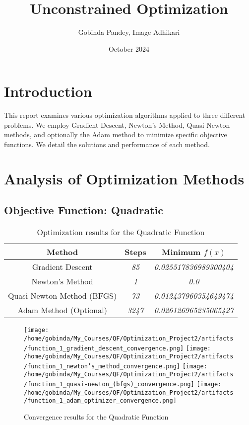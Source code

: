 \documentclass[12pt]{article}
\title{Unconstrained Optimization}
\author{Gobinda Pandey, Image Adhikari}
\date{October 2024}
\begin{document}
\maketitle

\section{Introduction}
This report examines various optimization algorithms applied to three different problems. We employ Gradient Descent, Newton's Method, Quasi-Newton methods, and optionally the Adam method to minimize specific objective functions. We detail the solutions and performance of each method.

\section{Analysis of Optimization Methods}
\subsection*{Objective Function: Quadratic}
\begin{table}[htbp]
   \centering
   \small %
   \begin{tabular}{|c|c|c|}
      \hline
      \textbf{Method} & \textbf{Steps} & \textbf{Minimum \( f(x) \)} \\
      \hline
      Gradient Descent & \textit{85} & \textit{0.025517836989300404} \\
      \hline
      Newton's Method & \textit{1} & \textit{0.0} \\
      \hline
      Quasi-Newton Method (BFGS) & \textit{73} & \textit{0.012437960354649474} \\
      \hline
      Adam Method (Optional) & \textit{3247} & \textit{0.026126965235065427} \\
      \hline
   \end{tabular}
   \caption{\small Optimization results for the Quadratic Function}
   \label{tab:quadratic_function_results}
\end{table}

\begin{figure}[htbp]
   \centering
   \texttt{[image: /home/gobinda/My\_Courses/QF/Optimization\_Project2/artifacts/function\_1\_gradient\_descent\_convergence.png]}
   \texttt{[image: /home/gobinda/My\_Courses/QF/Optimization\_Project2/artifacts/function\_1\_newton's\_method\_convergence.png]}
   \texttt{[image: /home/gobinda/My\_Courses/QF/Optimization\_Project2/artifacts/function\_1\_quasi-newton\_(bfgs)\_convergence.png]}
   \texttt{[image: /home/gobinda/My\_Courses/QF/Optimization\_Project2/artifacts/function\_1\_adam\_optimizer\_convergence.png]}
   \caption{\small Convergence results for the Quadratic Function}
   \label{fig:quadratic_function_convergence}
\end{figure}
\end{document}
